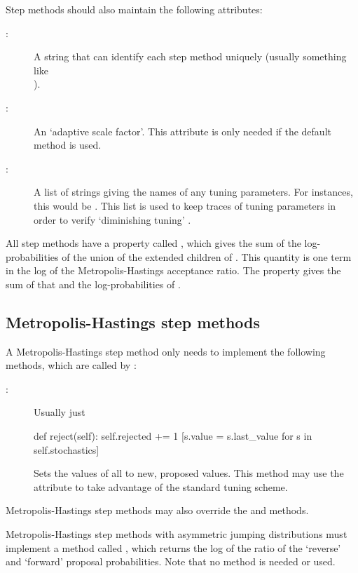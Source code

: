 \documentclass[]{jss}
\begin{document}
Step methods should also maintain the following attributes:
\begin{description}
   \item[:] A string that can identify each step method uniquely (usually something like \\).
   \item[:] An `adaptive scale factor'. This attribute is only needed if the default  method is used.
   \item[:] A list of strings giving the names of any tuning parameters. For  instances, this would be . This list is used to keep traces of tuning parameters in order to verify `diminishing tuning' \citep{tuning}.
\end{description}

All step methods have a property called , which gives the sum of the log-probabilities of the union of the extended children of . This quantity is one term in the log of the Metropolis-Hastings acceptance ratio. The  property gives the sum of that and the log-probabilities of .  



\subsection{Metropolis-Hastings step methods} \label{user-metro}

A Metropolis-Hastings step method only needs to implement the following methods, which are called by :
\begin{description}
   \item[:] Usually just
   \begin{CodeInput}
def reject(self):
self.rejected += 1
[s.value = s.last_value for s in self.stochastics]
\end{CodeInput}
   \item[] Sets the values of all  to new, proposed values. This method may use the  attribute to take advantage of the standard tuning scheme.
\end{description}
Metropolis-Hastings step methods may also override the  and  methods.

Metropolis-Hastings step methods with asymmetric jumping distributions must implement a method called , which returns the log of the ratio of the `reverse' and `forward' proposal probabilities. Note that no  method is needed or used.
\end{document}
